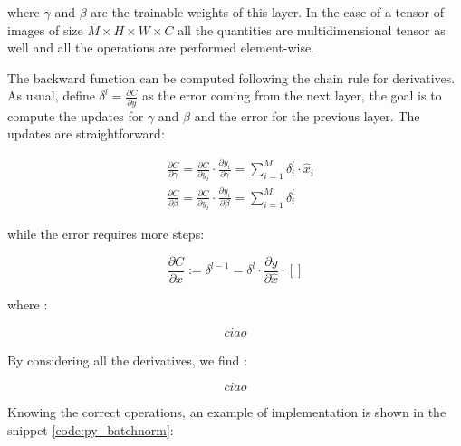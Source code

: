 \documentclass[12pt,a4paper]{report}
\begin{document}
where $\gamma$ and $\beta$ are the trainable weights of this layer. In the case of a tensor of images of size $M \times H \times W \times C$ all the quantities are multidimensional tensor as well and all the operations are performed element-wise.

The backward function can be computed following the chain rule for derivatives. As usual, define $\delta^l = \frac{\partial C}{\partial y}$ as the error coming from the next layer, the goal is to compute the updates for $\gamma$ and $\beta$ and the error for the previous layer. 
The updates are straightforward: 

\begin{align}
 &\frac{\partial C}{\partial \gamma} = \frac{\partial C}{\partial y_i} \cdot \frac{\partial y_i}{\partial \gamma} = \sum_{i=1}^{M} \delta_i^l \cdot \hat x_i \\
 &\frac{\partial C}{\partial \beta} = \frac{\partial C}{\partial y_i} \cdot \frac{\partial y_i}{\partial \beta} = \sum_{i=1}^M \delta_i^l 
\end{align}

while the error requires more steps:

\begin{equation}
 \frac{\partial C}{\partial x} := \delta^{l-1} = \delta^l \cdot \frac{\partial y}{\partial \hat x} \cdot []
\end{equation}

where : 

\begin{align}
 ciao
\end{align}

By considering all the derivatives, we find :

\begin{equation}
 ciao
\end{equation}


Knowing the correct operations, an example of implementation is shown in the snippet \ref{code:py_batchnorm}: 
\end{document}
